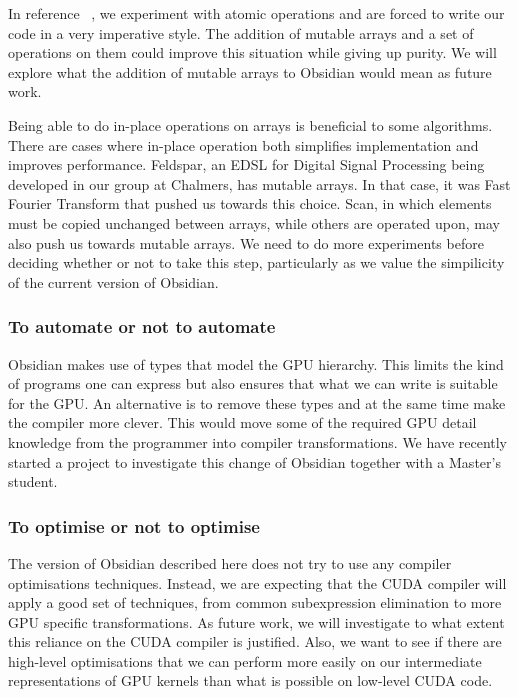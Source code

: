 In reference ~, we experiment with atomic operations 
and are forced to write our code in a very imperative style. The addition of mutable 
arrays and a set of operations on them could improve this situation 
while giving up purity. We will explore what the addition of mutable arrays to 
Obsidian would mean as future work. 

Being able to do in-place operations on arrays is beneficial to some algorithms. 
There are cases where in-place operation both simplifies implementation and improves performance.
Feldspar, an EDSL for Digital Signal Processing being developed in our group at Chalmers, has mutable arrays. In that case, it was Fast Fourier Transform
that pushed us towards this choice. Scan, in which elements must be copied
unchanged between arrays, while others are operated upon, may also push us towards mutable arrays. We need
to do more experiments before deciding whether or not to take this step,
particularly as we value the simpilicity of the current version of Obsidian.

\subsubsection{To automate or not to automate} 
Obsidian makes use of types that model the GPU hierarchy. This limits 
the kind of programs one can express but also ensures that what we can write 
is suitable for the GPU. An alternative is to remove these types and at the 
same time make the compiler more clever. This would move some of the 
required GPU detail knowledge from the programmer into compiler transformations. 
We have recently started a project to investigate this change of Obsidian
together with a Master's student. 

\subsubsection{To optimise or not to optimise} 
The version of Obsidian described here does not try to use any compiler optimisations techniques. Instead, we are expecting that the 
CUDA compiler will apply a good set of techniques, from common subexpression 
elimination to more GPU specific transformations. As future work, we 
will investigate to what extent this reliance on the CUDA
compiler is justified. Also, we want to 
see if there are high-level optimisations that we can perform more easily 
on our intermediate representations of GPU kernels than what is possible 
on low-level CUDA code. 

